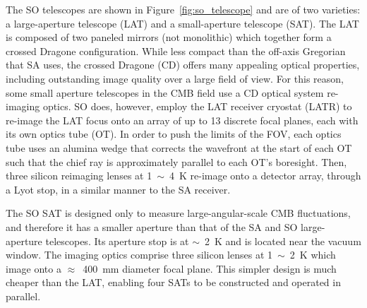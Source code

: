The SO telescopes are shown in Figure~\ref{fig:so_telescope} and are of two varieties: a large-aperture telescope (LAT) and a small-aperture telescope (SAT). The LAT is composed of two paneled mirrors (not monolithic) which together form a crossed Dragone configuration. While less compact than the off-axis Gregorian that SA uses, the crossed Dragone (CD) offers many appealing optical properties, including outstanding image quality over a large field of view. For this reason, some small aperture telescopes in the CMB field use a CD optical system re-imaging optics. SO does, however, employ the LAT receiver cryostat (LATR) to re-image the LAT focus onto an array of up to 13 discrete focal planes, each with its own optics tube (OT). In order to push the limits of the FOV, each optics tube uses an alumina wedge that corrects the wavefront at the start of each OT such that the chief ray is approximately parallel to each OT's boresight. Then, three silicon reimaging lenses at 1~$\sim$~4~K re-image onto a detector array, through a Lyot stop, in a similar manner to the SA receiver.

The SO SAT is designed only to measure large-angular-scale CMB fluctuations, and therefore it has a smaller aperture than that of the SA and SO large-aperture telescopes. Its aperture stop is at $\sim$~2~K and is located near the vacuum window. The imaging optics comprise three silicon lenses at 1~$\sim$~2~K which image onto a $\approx$~400~mm diameter focal plane. This simpler design is much cheaper than the LAT, enabling four SATs to be constructed and operated in parallel.


